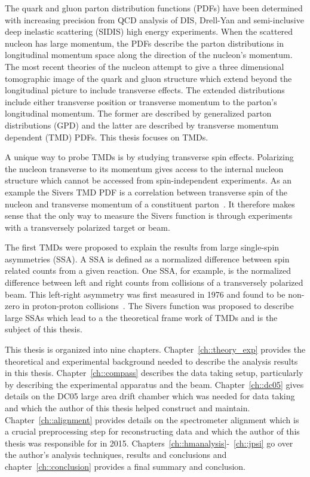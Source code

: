The quark and gluon parton distribution functions (PDFs) have been determined
with increasing precision from QCD analysis of DIS, Drell-Yan and semi-inclusive
deep inelastic scattering (SIDIS) high energy experiments.  When the scattered
nucleon has large momentum, the PDFs describe the parton distributions in
longitudinal momentum space along the direction of the nucleon's momentum.  The
most recent theories of the nucleon attempt to give a three dimensional
tomographic image of the quark and gluon structure which extend beyond the
longitudinal picture to include transverse effects.  The extended distributions
include either transverse position or transverse momentum to the parton's
longitudinal momentum.  The former are described by generalized parton
distributions (GPD) and the latter are described by transverse momentum
dependent (TMD) PDFs.  This thesis focuses on TMDs.

A unique way to probe TMDs is by studying transverse spin effects.  Polarizing
the nucleon transverse to its momentum gives access to the internal nucleon
structure which cannot be accessed from spin-independent experiments.  As an
example the Sivers TMD PDF is a correlation between transverse spin of the
nucleon and transverse momentum of a constituent parton~\cite{Sivers}.  It
therefore makes sense that the only way to measure the Sivers function is
through experiments with a transversely polarized target or beam.

The first TMDs were proposed to explain the results from large single-spin
asymmetries (SSA).  A SSA is defined as a normalized difference between spin
related counts from a given reaction.  One SSA, for example, is the normalized
difference between left and right counts from collisions of a transversely
polarized beam.  This left-right asymmetry was first measured in 1976 and found
to be non-zero in proton-proton collisions~\cite{PhysRevLett.36.929}.  The
Sivers function was proposed to describe large SSAs which lead to a the
theoretical frame work of TMDs and is the subject of this thesis.

This thesis is organized into nine chapters.  Chapter~\ref{ch::theory_exp}
provides the theoretical and experimental background needed to describe the
analysis results in this thesis.  Chapter~\ref{ch::compass} describes the data
taking setup, particularly by describing the experimental apparatus and the
beam.  Chapter~\ref{ch::dc05} gives details on the DC05 large area drift chamber
which was needed for data taking and which the author of this thesis helped
construct and maintain.  Chapter~\ref{ch::alignment} provides details on the
spectrometer alignment which is a crucial preprocessing step for reconstructing
data and which the author of this thesis was responsible for in 2015.
Chapters~\ref{ch::hmanalysis}-~\ref{ch::jpsi} go over the author's analysis
techniques, results and conclusions and chapter~\ref{ch::conclusion} provides a
final summary and conclusion.
